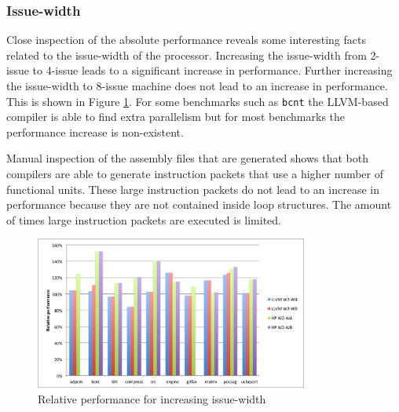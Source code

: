\subsubsection{Issue-width}
Close inspection of the absolute performance reveals some interesting facts related to the issue-width of the processor. Increasing the issue-width from 2-issue to 4-issue leads to a significant increase in performance. Further increasing the issue-width to 8-issue machine does not lead to an increase in performance. This is shown in Figure \ref{fig:rel_issue}. For some benchmarks such as \texttt{bcnt} the LLVM-based compiler is able to find extra parallelism but for most benchmarks the performance increase is non-existent.

Manual inspection of the assembly files that are generated shows that both compilers are able to generate instruction packets that use a higher number of functional units. These large instruction packets do not lead to an increase in performance because they are not contained inside loop structures. The amount of times large instruction packets are executed is limited. 

\begin{figure}[ht]
\centering
\includegraphics[width=0.8\textwidth]{5_results/img/rel_issue.png}
\caption{Relative performance for increasing issue-width}
\label{fig:rel_issue}
\end{figure}

